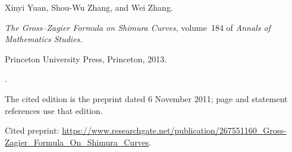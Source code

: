 Xinyi Yuan, Shou-Wu Zhang, and Wei Zhang.

\newblock \emph{The Gross--Zagier Formula on Shimura Curves}, volume~184 of
  \emph{Annals of Mathematics Studies}.

\newblock Princeton University Press, Princeton, 2013.

\newblock {}.

\newblock The cited edition is the preprint dated 6 November 2011;
  page and statement references use that edition.

\newblock Cited preprint: \url{https://www.researchgate.net/publication/267551160_Gross-Zagier_Formula_On_Shimura_Curves}.
